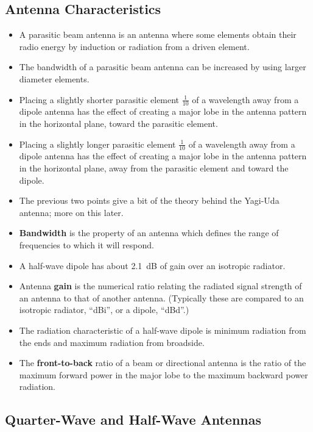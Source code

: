 \documentclass[letterpaper,12pt]{article}
\begin{document}
\subsection{Antenna Characteristics}

\begin{itemize}
\item A parasitic beam antenna is an antenna where some elements obtain their radio energy by induction or radiation from a driven element.
\item The bandwidth of a parasitic beam antenna can be increased by using larger diameter elements.
\item Placing a slightly shorter parasitic element $\frac{1}{10}$ of a wavelength away from a dipole antenna has the effect of creating a major lobe
in the antenna pattern in the horizontal plane, toward the parasitic element.
\item Placing a slightly longer parasitic element $\frac{1}{10}$ of a wavelength away from a dipole antenna has the effect of creating a major lobe
in the antenna pattern in the horizontal plane, away from the parasitic element and toward the dipole.
\item The previous two points give a bit of the theory behind the Yagi-Uda antenna; more on this later. 
\item \textbf{Bandwidth} is the property of an antenna which defines the range of frequencies to which it will respond.
\item A half-wave dipole has about 2.1~dB of gain over an isotropic radiator.
\item Antenna \textbf{gain} is the numerical ratio relating the radiated signal strength of an antenna to that of another antenna.
(Typically these are compared to an isotropic radiator, ``dBi'', or a dipole, ``dBd''.)
\item The radiation characteristic of a half-wave dipole is minimum radiation from the ends and maximum radiation from broadside.
\item The \textbf{front-to-back} ratio of a beam or directional antenna is the ratio of the maximum forward power in the major lobe
to the maximum backward power radiation.
\end{itemize}

\subsection{Quarter-Wave and Half-Wave Antennas}
\end{document}
